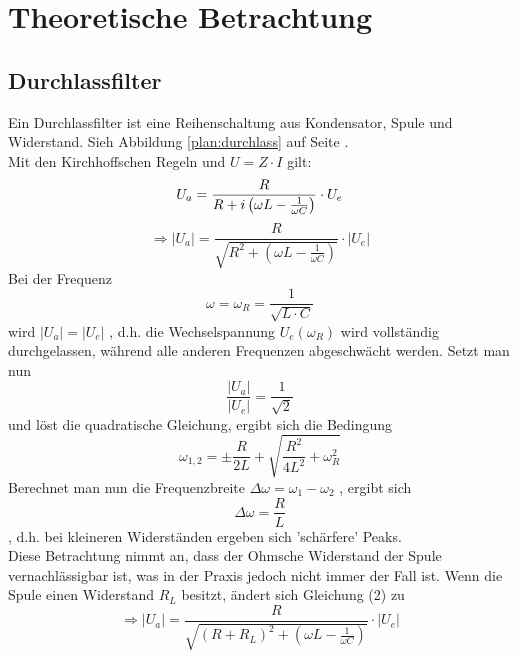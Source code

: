 \section{Theoretische Betrachtung}
\subsection{Durchlassfilter}
Ein Durchlassfilter ist eine Reihenschaltung aus Kondensator, Spule und Widerstand. Sieh Abbildung \ref{plan:durchlass} auf Seite \pageref{plan:durchlass}.\\
Mit den Kirchhoffschen Regeln und 
$
U=Z\cdot I
$ 
gilt:
\begin{equation}
U_a=\frac{R}{R+i\left(\omega L-\frac{1}{\omega C}\right)}\cdot U_e\\
\end{equation}
\begin{equation}
\Rightarrow\left| U_a \right| = \frac{R}{\sqrt{R^2+\left(\omega L - \frac{1}{\omega C}\right)}}\cdot \left| U_e \right|
\end{equation}
Bei der Frequenz
\begin{equation}
\omega=\omega_R=\frac{1}{\sqrt{L\cdot C}}
\end{equation}
wird
$
\left|U_a \right| = \left|U_e \right|
$
, d.h. die Wechselspannung $U_e(\omega_R)$ wird vollständig durchgelassen, während alle anderen Frequenzen abgeschwächt werden.
  Setzt man nun
\begin{equation}
\frac{\left|U_a \right|}{\left|U_e \right|}=\frac{1}{\sqrt{2}}
\end{equation}
und löst die quadratische Gleichung, ergibt sich die Bedingung
\begin{equation}
\omega_{1,2}=\pm \frac{R}{2L}+\sqrt{\frac{R^2}{4L^2}+\omega_R^2}
\end{equation}
Berechnet man nun die Frequenzbreite
$
\Delta \omega=\omega_1-\omega_2
$
, ergibt sich
\begin{equation}
\Delta \omega=\frac{R}{L}
\end{equation}
, d.h. bei kleineren Widerständen ergeben sich 'schärfere' Peaks.
\\
Diese Betrachtung nimmt an, dass der Ohmsche Widerstand der Spule vernachlässigbar ist, was in der Praxis jedoch nicht immer der Fall ist.
Wenn die Spule einen Widerstand $R_L$ besitzt, ändert sich Gleichung (2) zu
\begin{equation}
\Rightarrow\left| U_a \right| = \frac{R}{\sqrt{(R+R_L)^2+\left(\omega L - \frac{1}{\omega C}\right)}}\cdot \left| U_e \right|
\end{equation}
